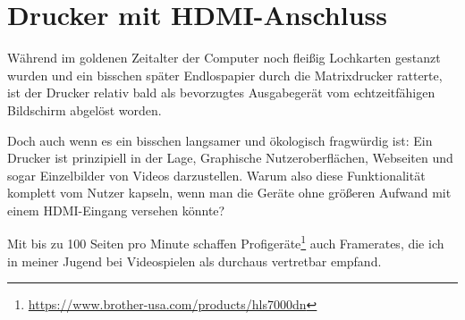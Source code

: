 \documentclass[a5paper,pagesize,10pt,bibtotoc,pointlessnumbers,normalheadings,DIV=9,twoside=false]{scrbook}
\begin{document}


\chapter{Drucker mit HDMI-Anschluss}

Während im goldenen Zeitalter der Computer noch fleißig Lochkarten gestanzt wurden und ein bisschen später Endlospapier durch die Matrixdrucker ratterte, ist der Drucker relativ bald als bevorzugtes Ausgabegerät vom echtzeitfähigen Bildschirm abgelöst worden.

Doch auch wenn es ein bisschen langsamer und ökologisch fragwürdig ist:
Ein Drucker ist prinzipiell in der Lage, Graphische Nutzeroberflächen, Webseiten und sogar Einzelbilder von Videos darzustellen.
Warum also diese Funktionalität komplett vom Nutzer kapseln, wenn man die Geräte ohne größeren Aufwand mit einem HDMI-Eingang versehen könnte?

Mit bis zu 100 Seiten pro Minute schaffen Profigeräte\footnote{\url{https://www.brother-usa.com/products/hls7000dn}} auch Framerates, die ich in meiner Jugend bei Videospielen als durchaus vertretbar empfand.
\end{document}
